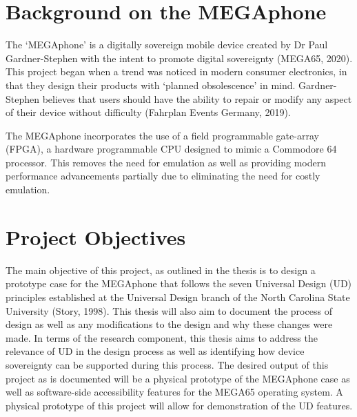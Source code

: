 
\section{Background on the MEGAphone}

The ‘MEGAphone’ is a digitally sovereign mobile device created by Dr Paul Gardner-Stephen with the intent to promote digital sovereignty (MEGA65, 2020).
This project began when a trend was noticed in modern consumer electronics, in that they design their products with ‘planned obsolescence’ in mind. 
Gardner-Stephen believes that users should have the ability to repair or modify any aspect of their device without difficulty (Fahrplan Events Germany, 2019).

The MEGAphone incorporates the use of a field programmable gate-array (FPGA), a hardware programmable CPU designed to mimic a Commodore 64 processor. 
This removes the need for emulation as well as providing modern performance advancements partially due to eliminating the need for costly emulation.



\section{Project Objectives}

The main objective of this project, as outlined in the thesis is to design a prototype case for the MEGAphone that follows the seven Universal Design (UD) principles established at the Universal Design branch of the North Carolina State University (Story, 1998). 
This thesis will also aim to document the process of design as well as any modifications to the design and why these changes were made. 
In terms of the research component, this thesis aims to address the relevance of UD in the design process as well as identifying how device sovereignty can be supported during this process. 
The desired output of this project as is documented will be a physical prototype of the MEGAphone case as well as software-side accessibility features for the MEGA65 operating system. 
A physical prototype of this project will allow for demonstration of the UD features.
 
